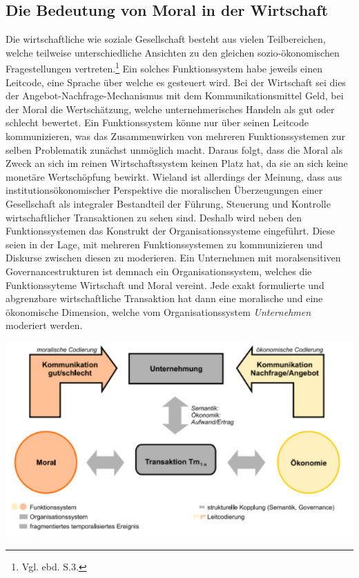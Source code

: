 \documentclass[12pt]{article}
\begin{document}
\subsection{Die Bedeutung von Moral in der Wirtschaft}
Die wirtschaftliche wie soziale Gesellschaft besteht aus vielen Teilbereichen, welche teilweise unterschiedliche Ansichten zu den gleichen sozio-ökonomischen Fragestellungen vertreten.\footnote{Vgl. ebd. S.3.} Ein solches Funktionssystem habe jeweils einen Leitcode, eine Sprache über welche es gesteuert wird. Bei der Wirtschaft sei dies der Angebot-Nachfrage-Mechanismus mit dem Kommunikationsmittel Geld, bei der Moral die Wertschätzung, welche unternehmerisches Handeln als gut oder schlecht bewertet. Ein Funktionssystem könne nur über seinen Leitcode kommunizieren, was das Zusammenwirken von mehreren Funktionssystemen zur selben Problematik zunächst unmöglich macht. Daraus folgt, dass die Moral als Zweck an sich im reinen Wirtschaftssystem keinen Platz hat, da sie an sich keine monetäre Wertschöpfung bewirkt. Wieland ist allerdings der Meinung, dass aus institutionsökonomischer Perspektive die moralischen Überzeugungen einer Gesellschaft als integraler Bestandteil der Führung, Steuerung und Kontrolle wirtschaftlicher Transaktionen zu sehen sind. Deshalb wird neben den Funktionssystemen das Konstrukt der Organisationssysteme eingeführt. Diese seien in der Lage, mit mehreren Funktionssystemen zu kommunizieren und Diskurse zwischen diesen zu moderieren. Ein Unternehmen mit moralsensitiven Governancestrukturen ist demnach ein Organisationssystem, welches die Funktionssyteme Wirtschaft und Moral vereint. Jede exakt formulierte und abgrenzbare wirtschaftliche Transaktion hat dann eine moralische und eine ökonomische Dimension, welche vom Organisationssystem \textit{Unternehmen} moderiert werden.
\begin{center}
\includegraphics[width=.85\textwidth]{wieland1.png}
\end{center}
\end{document}
